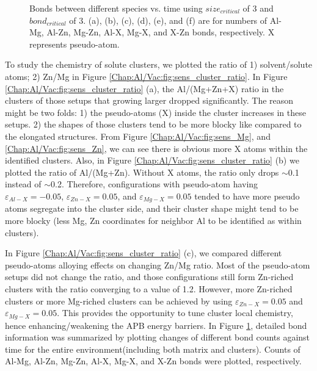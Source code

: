 \begin{figure}[!ht]
\caption[Bonds between different species vs. time using $size_{critical}$ of 3 and $bond_{critical}$ of 3.]{Bonds between different species vs. time using $size_{critical}$ of 3 and $bond_{critical}$ of 3. (a), (b), (c), (d), (e), and (f) are for numbers of Al-Mg, Al-Zn, Mg-Zn, Al-X, Mg-X, and X-Zn bonds, respectively. X represents pseudo-atom.}
\label{Chap:Al/Vac:fig:sens_bond}
\end{figure}
\endgroup


To study the chemistry of solute clusters, we plotted the ratio of 1) solvent/solute atoms; 2) Zn/Mg in Figure \ref{Chap:Al/Vac:fig:sens_cluster_ratio}. In Figure \ref{Chap:Al/Vac:fig:sens_cluster_ratio} (a), the Al/(Mg+Zn+X) ratio in the clusters of those setups that growing larger dropped significantly. The reason might be two folds: 1) the pseudo-atoms (X) inside the cluster increases in these setups. 2) the shapes of those clusters tend to be more blocky like compared to the elongated structures. From Figure \ref{Chap:Al/Vac:fig:sens_Mg}, and \ref{Chap:Al/Vac:fig:sens_Zn}, we can see there is obvious more X atoms within the identified clusters. Also, in Figure \ref{Chap:Al/Vac:fig:sens_cluster_ratio} (b) we plotted the ratio of Al/(Mg+Zn). Without X atoms, the ratio only drops $\sim$0.1 instead of $\sim$0.2. Therefore, configurations with pseudo-atom having  $\varepsilon_{Al-X} = -0.05$, $\varepsilon_{Zn-X} = 0.05$, and $\varepsilon_{Mg-X} = 0.05$ tended to have more pseudo atoms segregate into the cluster side, and their cluster shape might tend to be more blocky (less Mg, Zn coordinates for neighbor Al to be identified as within clusters).


In Figure \ref{Chap:Al/Vac:fig:sens_cluster_ratio} (c), we compared different pseudo-atoms alloying effects on changing Zn/Mg ratio. Most of the pseudo-atom setups did not change the ratio, and those configurations still form Zn-riched clusters with the ratio converging to a value of 1.2. However, more Zn-riched clusters or more Mg-riched clusters can be achieved by using $\varepsilon_{Zn-X} = 0.05$ and $\varepsilon_{Mg-X} = 0.05$. This provides the opportunity to tune cluster local chemistry, hence enhancing/weakening the APB energy barriers. In Figure \ref{Chap:Al/Vac:fig:sens_bond}, detailed bond information was summarized by plotting changes of different bond counts against time for the entire environment(including both matrix and clusters). Counts of Al-Mg, Al-Zn, Mg-Zn, Al-X, Mg-X, and X-Zn bonds were plotted, respectively.


